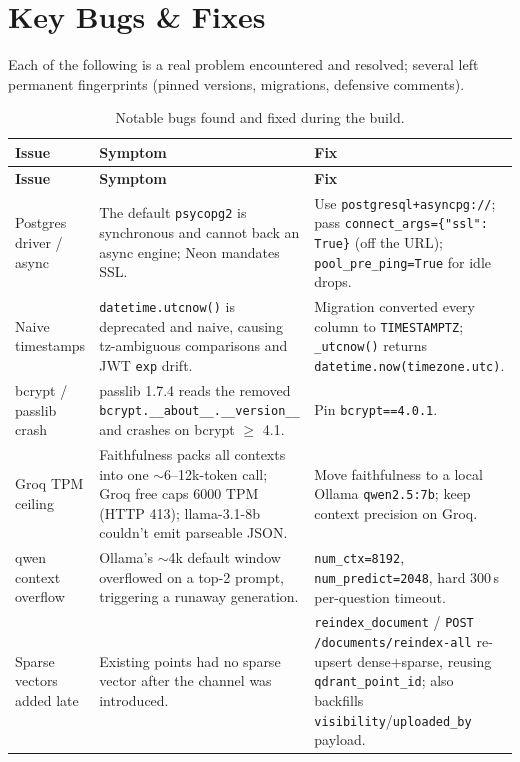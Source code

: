 \documentclass[11pt,a4paper,oneside]{report}
\newcommand{\code}[1]{\texttt{#1}}
\begin{document}
\section{Key Bugs \& Fixes}
Each of the following is a real problem encountered and resolved; several left permanent fingerprints
(pinned versions, migrations, defensive comments).

\begin{small}
\begin{longtable}{|L{2.7cm}|L{5.0cm}|L{6.3cm}|}
\caption{Notable bugs found and fixed during the build.}\label{tab:bugs}\\
\hline
{}
{\color{white}\textbf{Issue}} & {\color{white}\textbf{Symptom}} & {\color{white}\textbf{Fix}}\\
\hline
\endfirsthead
\hline
{}
{\color{white}\textbf{Issue}} & {\color{white}\textbf{Symptom}} & {\color{white}\textbf{Fix}}\\
\hline
\endhead
\hline
\endfoot
Postgres driver / async & The default \code{psycopg2} is synchronous and cannot back an async engine; Neon mandates SSL. & Use \code{postgresql+asyncpg://}; pass \code{connect\_args=\{"ssl": True\}} (off the URL); \code{pool\_pre\_ping=True} for idle drops.\\ \hline
Naive timestamps & \code{datetime.utcnow()} is deprecated and naive, causing tz-ambiguous comparisons and JWT \code{exp} drift. & Migration converted every column to \code{TIMESTAMPTZ}; \code{\_utcnow()} returns \code{datetime.now(timezone.utc)}.\\ \hline
bcrypt / passlib crash & passlib 1.7.4 reads the removed \code{bcrypt.\_\_about\_\_.\_\_version\_\_} and crashes on bcrypt $\geq$ 4.1. & Pin \code{bcrypt==4.0.1}.\\ \hline
Groq TPM ceiling & Faithfulness packs all contexts into one $\sim$6--12k-token call; Groq free caps 6000 TPM (HTTP 413); llama-3.1-8b couldn't emit parseable JSON. & Move faithfulness to a local Ollama \code{qwen2.5:7b}; keep context precision on Groq.\\ \hline
qwen context overflow & Ollama's $\sim$4k default window overflowed on a top-2 prompt, triggering a runaway generation. & \code{num\_ctx=8192}, \code{num\_predict=2048}, hard 300\,s per-question timeout.\\ \hline
Sparse vectors added late & Existing points had no sparse vector after the channel was introduced. & \code{reindex\_document} / \code{POST /documents/reindex-all} re-upsert dense+sparse, reusing \code{qdrant\_point\_id}; also backfills \code{visibility}/\code{uploaded\_by} payload.\\ \hline

\end{longtable}
\end{small}
\end{document}
